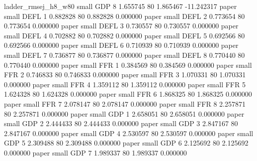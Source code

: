      ladder_rmsej_h8_w80      small      GDP                 8 1.655745 80       1.865467         -11.242317
                   paper      small     DEFL                 1 0.882828 80       0.882828           0.000000
                   paper      small     DEFL                 2 0.773654 80       0.773654           0.000000
                   paper      small     DEFL                 3 0.730557 80       0.730557           0.000000
                   paper      small     DEFL                 4 0.702882 80       0.702882           0.000000
                   paper      small     DEFL                 5 0.692566 80       0.692566           0.000000
                   paper      small     DEFL                 6 0.710939 80       0.710939           0.000000
                   paper      small     DEFL                 7 0.736877 80       0.736877           0.000000
                   paper      small     DEFL                 8 0.770440 80       0.770440           0.000000
                   paper      small      FFR                 1 0.384569 80       0.384569           0.000000
                   paper      small      FFR                 2 0.746833 80       0.746833           0.000000
                   paper      small      FFR                 3 1.070331 80       1.070331           0.000000
                   paper      small      FFR                 4 1.359112 80       1.359112           0.000000
                   paper      small      FFR                 5 1.624328 80       1.624328           0.000000
                   paper      small      FFR                 6 1.868325 80       1.868325           0.000000
                   paper      small      FFR                 7 2.078147 80       2.078147           0.000000
                   paper      small      FFR                 8 2.257871 80       2.257871           0.000000
                   paper      small      GDP                 1 2.658051 80       2.658051           0.000000
                   paper      small      GDP                 2 2.444433 80       2.444433           0.000000
                   paper      small      GDP                 3 2.847167 80       2.847167           0.000000
                   paper      small      GDP                 4 2.530597 80       2.530597           0.000000
                   paper      small      GDP                 5 2.309488 80       2.309488           0.000000
                   paper      small      GDP                 6 2.125692 80       2.125692           0.000000
                   paper      small      GDP                 7 1.989337 80       1.989337           0.000000
